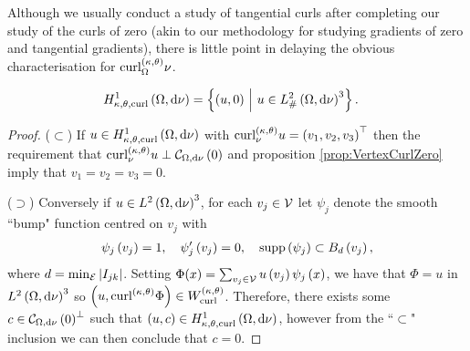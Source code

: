 Although we usually conduct a study of tangential curls after completing our study of the curls of zero (akin to our methodology for studying gradients of zero and tangential gradients), there is little point in delaying the obvious characterisation for $\mathrm{curl}_{\Omega}^{\left( \kappa, \theta \right)}{\nu}$.
\begin{cory} \label{cory:VertexCurlSob}
	\begin{align*}
		H^1_{\kappa,\theta,\mathrm{curl}}\left( \Omega, \mathrm{d}\nu \right) &= \left\{  \left( u,0 \right) \ \middle\vert \  u\in L^2_{\#}\left( \Omega,\mathrm{d} \nu \right)^3  \right\}.
	\end{align*}
\end{cory}
\begin{proof}
	($\subset$) If $u\in H^1_{\kappa,\theta,\mathrm{curl}}\left( \Omega, \mathrm{d}\nu \right)$ with $\mathrm{curl}_{\nu}^{\left( \kappa, \theta \right)}u=\left( v_1,v_2,v_3 \right)^\top$ then the requirement that $\mathrm{curl}_{\nu}^{\left( \kappa, \theta \right)}u \perp \mathcal{C}_{ \Omega, \mathrm{d}\nu}\left( 0 \right)$ and proposition \ref{prop:VertexCurlZero} imply that $v_1=v_2=v_3=0$.
	
	($\supset$) Conversely if $u\in L^{2}\left( \Omega,\mathrm{d} \nu \right)^3$, for each $v_j\in\mathcal{V}$ let $\psi_j$ denote the smooth ``bump" function centred on $v_j$ with
	\begin{align*}
		\psi_j\left( v_j \right) = 1, \quad
		\psi_j'\left( v_j \right) = 0, \quad
		\mathrm{supp}\left( \psi_j \right) \subset B_d\left( v_j \right),
	\end{align*}
	where $d=\min_{\mathcal{E}}\left\lvert I_{jk} \right\rvert$.
	Setting $\Phi(x) = \sum_{v_j\in\mathcal{V}}u\left( v_j \right)\psi_j\left( x \right)$, we have that $\Phi=u$ in $L^{2}\left( \Omega,\mathrm{d} \nu \right)^3$ so $\left( u,\mathrm{curl}_{}^{\left( \kappa, \theta \right)}\Phi \right)\in W^{\left( \kappa, \theta \right)}_{\mathrm{curl}}$.
	Therefore, there exists some $c\in\mathcal{C}_{ \Omega, \mathrm{d}\nu}\left( 0 \right)^{\perp}$ such that $\left( u,c \right)\in H^1_{\kappa,\theta,\mathrm{curl}}\left( \Omega, \mathrm{d}\nu \right)$, however from the ``$\subset$" inclusion we can then conclude that $c = 0$.
\end{proof}

